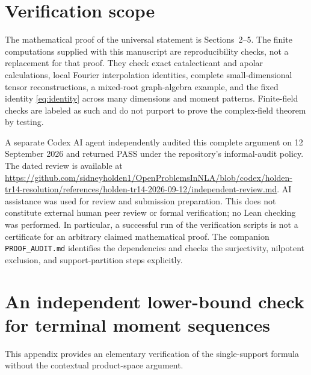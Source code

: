 \documentclass[11pt]{article}
\theoremstyle{definition}
\theoremstyle{remark}
\begin{document}
\section{Verification scope}\label{sec:verification}

The mathematical proof of the universal statement is Sections~2--5.
The finite computations supplied with this manuscript are reproducibility
checks, not a replacement for that proof. They check exact catalecticant and
apolar calculations, local Fourier interpolation identities, complete
small-dimensional tensor reconstructions, a mixed-root graph-algebra example,
and the fixed identity \eqref{eq:identity} across many dimensions and moment
patterns. Finite-field checks are labeled as such and do not purport to prove
the complex-field theorem by testing.

A separate Codex AI agent independently audited this complete argument on
12 September 2026 and returned PASS under the repository's informal-audit
policy. The dated review is available at
\url{https://github.com/sidneyholden1/OpenProblemsInNLA/blob/codex/holden-tr14-resolution/references/holden-tr14-2026-09-12/independent-review.md}.
AI assistance was used for review and submission preparation. This does not
constitute external human peer review or formal verification; no Lean checking
was performed. In particular, a successful run of the verification scripts is not
a certificate for an arbitrary claimed mathematical proof. The companion
\texttt{PROOF\_AUDIT.md} identifies the dependencies and checks the
surjectivity, nilpotent exclusion, and support-partition steps explicitly.

\appendix
\section{An independent lower-bound check for terminal moment sequences}

This appendix provides an elementary verification of the single-support
formula without the contextual product-space argument.
\end{document}
